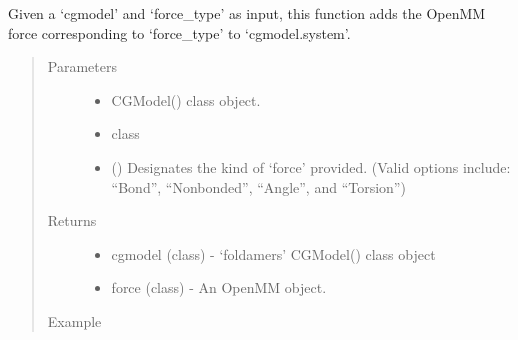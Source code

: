 \documentclass[letterpaper,12pt,english,openany,oneside]{sphinxmanual}
\begin{document}
\begin{fulllineitems}
\label{\detokenize{build:build.cg_build.add_force}}
Given a ‘cgmodel’ and ‘force\_type’ as input, this function adds
the OpenMM force corresponding to ‘force\_type’ to ‘cgmodel.system’.
\begin{quote}\begin{description}
\item[{Parameters}] \leavevmode\begin{itemize}
\item {} 
 \textendash{} CGModel() class object.

\item {} 
 \textendash{} class

\item {} 
 () \textendash{} Designates the kind of ‘force’ provided. (Valid options include: “Bond”, “Nonbonded”, “Angle”, and “Torsion”)

\end{itemize}

\item[{Returns}] \leavevmode
\begin{itemize}
\item {} 
cgmodel (class) - ‘foldamers’ CGModel() class object

\item {} 
force (class) - An OpenMM  object.

\end{itemize}


\item[{Example}] \leavevmode
\end{description}\end{quote}

\begin{sphinxVerbatim}[commandchars=\\\{\}]
   
  
  
  
\end{sphinxVerbatim}

\end{fulllineitems}
\end{document}
